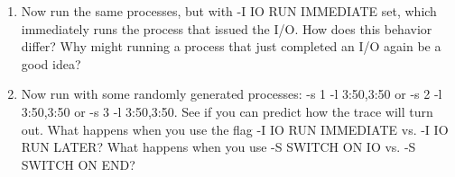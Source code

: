 \documentclass[12pt]{article}
\begin{document}
\begin{enumerate}[1.]
    \item Now run the same processes, but with -I IO RUN IMMEDIATE set,
    which immediately runs the process that issued the I/O. How does
    this behavior differ? Why might running a process that just completed an I/O again be a good idea?

    \item  Now run with some randomly generated processes: -s 1 -l 3:50,3:50
    or -s 2 -l 3:50,3:50 or -s 3 -l 3:50,3:50. See if you can
    predict how the trace will turn out. What happens when you use
    the flag -I IO RUN IMMEDIATE vs. -I IO RUN LATER? What happens when you
    use -S SWITCH ON IO vs. -S SWITCH ON END?
\end{enumerate}
\end{document}
